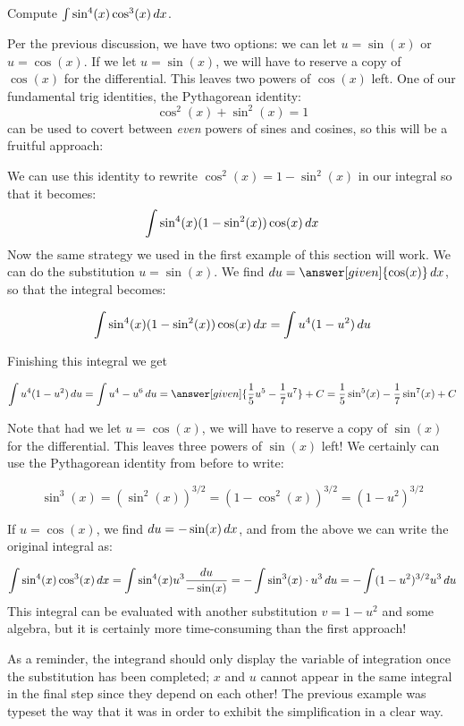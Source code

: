 \documentclass{ximera}
\begin{document}
\begin{example}
Compute $\int \sin^{4}(x) \cos^{3}(x) \mathop{}\!d x $.

\begin{explanation}
Per the previous discussion, we have two options: we can let $u= \sin(x)$ or $u=\cos(x)$.  
If we let $u = \sin(x)$, we will have to reserve a copy of $\cos(x)$ for the differential. This leaves two powers of $\cos(x)$ left.   One of our fundamental trig identities, the Pythagorean identity:
\[
\cos^{2}(x) + \sin^{2}(x)=1
\]
can be used to covert between \emph{even} powers of sines and cosines, so this will be a fruitful approach:

We can use this identity to rewrite $\cos^{2}(x)=1-\sin^{2}(x)$ in our integral so that it becomes:
\[
\int \sin^{4}(x) (1-\sin^{2}(x)) \cos(x) \mathop{}\!d x
\]
Now the same strategy we used in the first example of this section will work. We can do the substitution $u=\sin(x)$. We find $\d u= \answer[given]{\cos(x)} \d x$, so that the integral becomes:

\[ 
\int \sin^{4}(x) (1-\sin^{2}(x)) \cos(x) \mathop{}\!d x =  \int u^{4}(1-u^{2}) \mathop{}\!d u
\]

Finishing this integral we get 

\[ 
\int u^{4}(1-u^{2}) \d u= \int u^{4}-u^{6} \d u = \answer[given]{\frac{1}{5}u^5 - \frac{1}{7}u^7} + C =\frac{1}{5}\sin^{5}(x) - \frac{1}{7} \sin^{7}(x) + C
\]

Note that had we let $u = \cos(x)$, we will have to reserve a copy of $\sin(x)$ for the differential. This leaves three powers of $\sin(x)$ left! We certainly can use the Pythagorean identity from before to write:

\[ \sin^3(x) = \left(\sin^2(x)\right)^{3/2} = \left(1-\cos^2(x)\right)^{3/2} = (1-u^2)^{3/2} \]

If $u = \cos(x)$, we find $\mathop{}\!d u = -\sin(x) \mathop{}\!d x$, and from the above we can write the original integral as:

\[ 
\int \sin^{4}(x) \cos^{3}(x) \mathop{}\!d x = \int \sin^4(x) u^3 \frac{\mathop{}\!d u}{-\sin(x)} = -\int \sin^3(x) \cdot u^3 \mathop{}\!d u = -\int (1-u^2)^{3/2} u^3 \mathop{}\!d u
\]
This integral can be evaluated with another substitution $v = 1-u^2$ and some algebra, but it is certainly more time-consuming than the first approach!

\end{explanation}

\begin{remark}
As a reminder, the integrand should only display the variable of integration once the substitution has been completed; $x$ and $u$ cannot appear in the same integral in the final step since they depend on each other!  The previous example was typeset the way that it was in order to exhibit the simplification in a clear way.
\end{remark}
\end{example}
\end{document}
